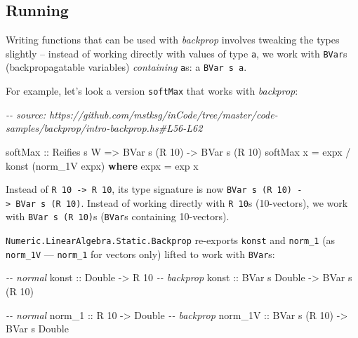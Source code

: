 \documentclass[]{article}
\newenvironment{Shaded}{}{}
\newcommand{\CommentTok}[1]{\textcolor[rgb]{0.38,0.63,0.69}{\textit{#1}}}
\newcommand{\DataTypeTok}[1]{\textcolor[rgb]{0.56,0.13,0.00}{#1}}
\newcommand{\DecValTok}[1]{\textcolor[rgb]{0.25,0.63,0.44}{#1}}
\newcommand{\FunctionTok}[1]{\textcolor[rgb]{0.02,0.16,0.49}{#1}}
\newcommand{\KeywordTok}[1]{\textcolor[rgb]{0.00,0.44,0.13}{\textbf{#1}}}
\newcommand{\NormalTok}[1]{#1}
\newcommand{\OperatorTok}[1]{\textcolor[rgb]{0.40,0.40,0.40}{#1}}
\newcommand{\OtherTok}[1]{\textcolor[rgb]{0.00,0.44,0.13}{#1}}
\begin{document}
\subsection{Running}\label{running-1}

Writing functions that can be used with \emph{backprop} involves tweaking the
types slightly -- instead of working directly with values of type \texttt{a}, we
work with \texttt{BVar}s (backpropagatable variables) \emph{containing}
\texttt{a}s: a \texttt{BVar\ s\ a}.

For example, let's look a version \texttt{softMax} that works with
\emph{backprop}:

\begin{Shaded}
\begin{Highlighting}[]
\CommentTok{{-}{-} source: https://github.com/mstksg/inCode/tree/master/code{-}samples/backprop/intro{-}backprop.hs\#L56{-}L62}

\NormalTok{softMax}
\OtherTok{    ::} \DataTypeTok{Reifies}\NormalTok{ s }\DataTypeTok{W}
    \OtherTok{=\textgreater{}} \DataTypeTok{BVar}\NormalTok{ s (}\DataTypeTok{R} \DecValTok{10}\NormalTok{)}
    \OtherTok{{-}\textgreater{}} \DataTypeTok{BVar}\NormalTok{ s (}\DataTypeTok{R} \DecValTok{10}\NormalTok{)}
\NormalTok{softMax x }\OtherTok{=}\NormalTok{ expx }\OperatorTok{/}\NormalTok{ konst (norm\_1V expx)}
  \KeywordTok{where}
\NormalTok{    expx }\OtherTok{=} \FunctionTok{exp}\NormalTok{ x}
\end{Highlighting}
\end{Shaded}

Instead of \texttt{R\ 10\ -\textgreater{}\ R\ 10}, its type signature is now
\texttt{BVar\ s\ (R\ 10)\ -\textgreater{}\ BVar\ s\ (R\ 10)}. Instead of working
directly with \texttt{R\ 10}s (10-vectors), we work with
\texttt{BVar\ s\ (R\ 10)}s (\texttt{BVar}s containing 10-vectors).

\texttt{Numeric.LinearAlgebra.Static.Backprop} re-exports \texttt{konst} and
\texttt{norm\_1} (as \texttt{norm\_1V} --- \texttt{norm\_1} for vectors only)
lifted to work with \texttt{BVar}s:

\begin{Shaded}
\begin{Highlighting}[]
\CommentTok{{-}{-} normal}
\OtherTok{konst   ::}        \DataTypeTok{Double} \OtherTok{{-}\textgreater{}}         \DataTypeTok{R} \DecValTok{10}
\CommentTok{{-}{-} backprop}
\OtherTok{konst   ::} \DataTypeTok{BVar}\NormalTok{ s }\DataTypeTok{Double} \OtherTok{{-}\textgreater{}} \DataTypeTok{BVar}\NormalTok{ s (}\DataTypeTok{R} \DecValTok{10}\NormalTok{)}

\CommentTok{{-}{-} normal}
\OtherTok{norm\_1  ::}         \DataTypeTok{R} \DecValTok{10}  \OtherTok{{-}\textgreater{}}        \DataTypeTok{Double}
\CommentTok{{-}{-} backprop}
\OtherTok{norm\_1V ::} \DataTypeTok{BVar}\NormalTok{ s (}\DataTypeTok{R} \DecValTok{10}\NormalTok{) }\OtherTok{{-}\textgreater{}} \DataTypeTok{BVar}\NormalTok{ s }\DataTypeTok{Double}
\end{Highlighting}
\end{Shaded}
\end{document}
